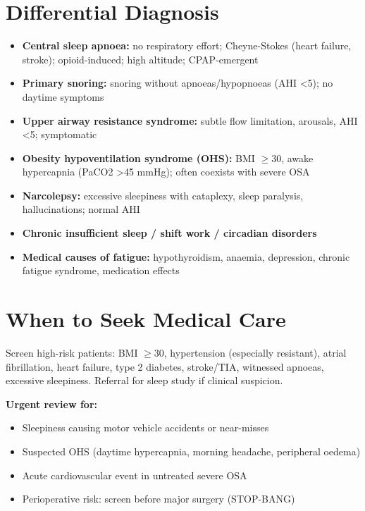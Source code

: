 \section*{Differential Diagnosis}
\begin{itemize}
    \item \textbf{Central sleep apnoea:} no respiratory effort; Cheyne-Stokes (heart failure, stroke); opioid-induced; high altitude; CPAP-emergent
    \item \textbf{Primary snoring:} snoring without apnoeas/hypopnoeas (AHI <5); no daytime symptoms
    \item \textbf{Upper airway resistance syndrome:} subtle flow limitation, arousals, AHI <5; symptomatic
    \item \textbf{Obesity hypoventilation syndrome (OHS):} BMI $\ge$30, awake hypercapnia (PaCO2 >45 mmHg); often coexists with severe OSA
    \item \textbf{Narcolepsy:} excessive sleepiness with cataplexy, sleep paralysis, hallucinations; normal AHI
    \item \textbf{Chronic insufficient sleep / shift work / circadian disorders}
    \item \textbf{Medical causes of fatigue:} hypothyroidism, anaemia, depression, chronic fatigue syndrome, medication effects
\end{itemize}

\section*{When to Seek Medical Care}
Screen high-risk patients: BMI $\ge$30, hypertension (especially resistant), atrial fibrillation, heart failure, type 2 diabetes, stroke/TIA, witnessed apnoeas, excessive sleepiness. Referral for sleep study if clinical suspicion.

\textbf{Urgent review for:}
\begin{itemize}
    \item Sleepiness causing motor vehicle accidents or near-misses
    \item Suspected OHS (daytime hypercapnia, morning headache, peripheral oedema)
    \item Acute cardiovascular event in untreated severe OSA
    \item Perioperative risk: screen before major surgery (STOP-BANG)
\end{itemize}

